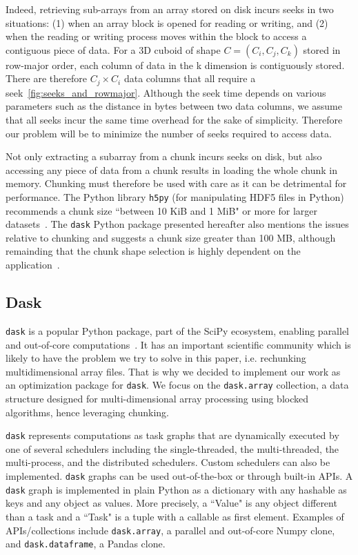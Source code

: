 \documentclass[conference]{IEEEtran}
\begin{document}
Indeed, retrieving sub-arrays from an array stored on disk incurs seeks in two
situations: (1) when an array block is opened for reading or writing, and (2)
when the reading or writing process moves within the block to access a
contiguous piece of data. For a 3D cuboid of shape $C = (C_i, C_j, C_k)$ stored
in row-major order, each column of data in the k dimension is contiguously
stored. There are therefore $C_j \times C_i$ data columns that all require a
seek~\ref{fig:seeks_and_rowmajor}. Although the seek time depends on various parameters such as the distance
in bytes between two data columns, we assume that all seeks incur the same time
overhead for the sake of simplicity. Therefore our problem will be to minimize
the number of seeks required to access data.

Not only extracting a subarray from a chunk incurs seeks on disk, but also
accessing any piece of data from a chunk results in loading the whole chunk in
memory. Chunking must therefore be used with care as it can be detrimental for
performance. The Python library \texttt{h5py} (for manipulating HDF5 files in
Python) recommends a chunk size ``between 10 KiB and 1 MiB" or more for larger
datasets~\cite{collette_2014}. The \texttt{dask} Python package presented
hereafter also mentions the issues relative to chunking and suggests a chunk
size greater than 100 MB, although remainding that the chunk shape selection is
highly dependent on the application~\cite{rocklin_bourbeau_2019}.

\subsection{Dask}
\texttt{dask} is a popular Python package, part of the SciPy ecosystem, enabling parallel
and out-of-core computations~\cite{matthew_rocklin-proc-scipy-2015}. It has an
important scientific community which is likely to have the problem we try to
solve in this paper, i.e. rechunking multidimensional array files. That is why
we decided to implement our work as an optimization package for \texttt{dask}.
We focus on the \texttt{dask.array} collection, a data structure designed for
multi-dimensional array processing using blocked algorithms, hence leveraging
chunking.

\texttt{dask} represents computations as task graphs that are dynamically executed by one
of several schedulers including the single-threaded, the multi-threaded, the
multi-process, and the distributed schedulers. Custom schedulers can also be
implemented. \texttt{dask} graphs can be used out-of-the-box or through
built-in APIs. A \texttt{dask} graph is implemented in plain Python as a
dictionary with any hashable as keys and any object as values. More precisely,
a ``Value" is any object different than a task and a ``Task" is a tuple with a
callable as first element. Examples of APIs/collections include
\texttt{dask.array}, a parallel and out-of-core
Numpy clone, and \texttt{dask.dataframe}, a Pandas clone.
\end{document}
